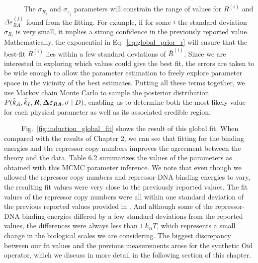 \documentclass[12pt]{caltech_thesis}
\begin{document}
~~~~~ The \(\sigma_{R_i}\) and \(\sigma_{\varepsilon_j}\) parameters
will constrain the range of values for \(R^{(i)}\) and
\(\Delta\varepsilon_{RA}^{(j)}\) found from the fitting. For example, if
for some \(i\) the standard deviation \(\sigma_{R_i}\) is very small, it
implies a strong confidence in the previously reported value.
Mathematically, the exponential in Eq.~\ref{eq:global_prior_r} will
ensure that the best-fit \(R^{(i)}\) lies within a few standard
deviations of \(\bar{R}^{(i)}\). Since we are interested in exploring
which values could give the best fit, the errors are taken to be wide
enough to allow the parameter estimation to freely explore parameter
space in the vicinity of the best estimates. Putting all these terms
together, we use Markov chain Monte Carlo to sample the posterior
distribution
\(P(\tilde{k}_A, \tilde{k}_I, \mathbf{\textbf{\textit{R}}}, \mathbf{\Delta \boldsymbol{\varepsilon}_{\textbf{\textit{RA}}}}, \sigma \mid D)\),
enabling us to determine both the most likely value for each physical
parameter as well as its associated credible region.

~~~~~Fig.~\ref{fig:induction_global_fit} shows the result of this global
fit. When compared with the results of Chapter 2, we can see that
fitting for the binding energies and the repressor copy numbers improves
the agreement between the theory and the data. Table 6.2 summarizes the
values of the parameters as obtained with this MCMC parameter inference.
We note that even though we allowed the repressor copy numbers and
repressor-DNA binding energies to vary, the resulting fit values were
very close to the previously reported values. The fit values of the
repressor copy numbers were all within one standard deviation of the
previous reported values provided in \textcite{garcia2011}. And although
some of the repressor-DNA binding energies differed by a few standard
deviations from the reported values, the differences were always less
than \(1~k_BT\), which represents a small change in the biological
scales we are considering. The biggest discrepancy between our fit
values and the previous measurements arose for the synthetic Oid
operator, which we discuss in more detail in the following section of
this chapter.
\end{document}
